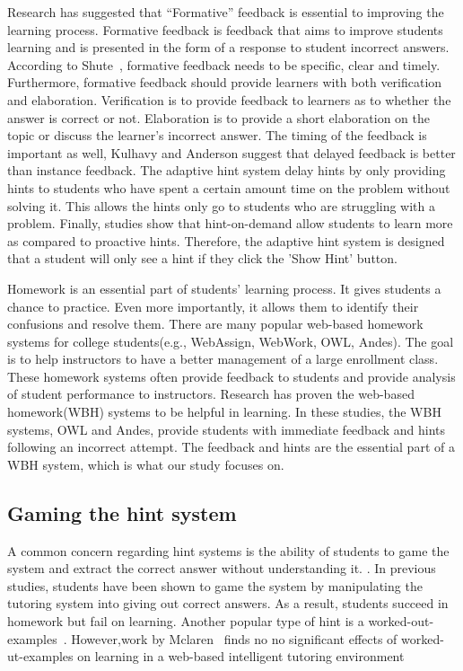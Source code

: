\documentclass{sigchi/sigchi}
\begin{document}
Research has suggested that ``Formative'' feedback is essential to
improving the learning
process\cite{Azevedo1995}\cite{Bangert-Drowns1991}. Formative feedback
is feedback that aims to improve students learning and is presented in
the form of a response to student incorrect
answers\cite{Shute2008}. According to Shute~\cite{Shute2008},
formative feedback needs to be specific, clear and
timely. Furthermore, formative feedback should provide learners with
both verification and
elaboration\cite{Mason2001}\cite{Bangert-Drowns1991}. Verification is
to provide feedback to learners as to whether the answer is correct or
not. Elaboration is to provide a short elaboration on the topic or
discuss the learner's incorrect answer. The timing of the feedback is
important as well, Kulhavy and Anderson suggest that delayed feedback
is better than instance feedback\cite{Kulhavy1972}. The adaptive hint
system delay hints by only providing hints to students who have spent
a certain amount time on the problem without solving it. This allows
the hints only go to students who are struggling with a
problem. Finally, studies show that hint-on-demand allow students to
learn more as compared to proactive hints\cite{Razzaq2010}. Therefore,
the adaptive hint system is designed that a student will only see a
hint if they click the 'Show Hint' button.

Homework is an essential part of students' learning
process\cite{Cooper2006}. It gives students a chance to practice. Even
more importantly, it allows them to identify their confusions and
resolve them. There are many popular web-based homework systems for
college students(e.g., WebAssign, WebWork, OWL, Andes). The goal is to
help instructors to have a better management of a large enrollment
class. These homework systems often provide feedback to students and
provide analysis of student performance to instructors. Research has
proven the web-based homework(WBH) systems to be helpful in
learning\cite{MestHartRath2002}\cite{Vanlehn2005}. In these studies,
the WBH systems, OWL and Andes, provide students with immediate
feedback and hints following an incorrect
attempt\cite{MestHartRath2002}\cite{Vanlehn2005}. The feedback and
hints are the essential part of a WBH system, which is what our study
focuses on.

\subsection*{Gaming the hint system}

A common concern regarding hint systems is the ability of students to
game the system and extract the correct answer without understanding
it.  \cite{Baker2004}\cite{Baker2005}. In previous studies, students
have been shown to game the system by manipulating the tutoring system
into giving out correct answers\cite{Baker2004Off-task}. As a result,
students succeed in homework but fail on learning. Another popular
type of hint is a worked-out-examples~\cite{Atkinson2000}.
However,work by Mclaren~\cite{McLaren2006} finds no no significant
effects of worked-ut-examples on learning in a web-based intelligent
tutoring environment
\end{document}
